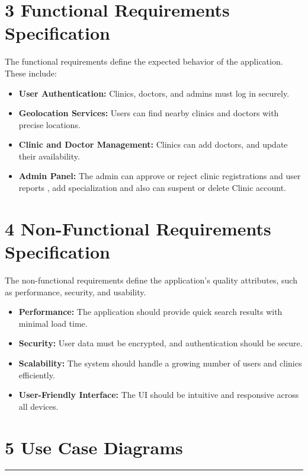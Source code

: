 \documentclass[12pt]{report}
\begin{document}
\section*{\textbf{3 Functional Requirements Specification}}

\noindent The functional requirements define the expected behavior of the application. These include:

\begin{itemize}
	\item \textbf{User Authentication:} Clinics, doctors, and admins must log in securely.
	\item \textbf{Geolocation Services:} Users can find nearby clinics and doctors with precise locations.
	\item \textbf{Clinic and Doctor Management:} Clinics can add doctors, and update their availability.
	\item \textbf{Admin Panel:} The admin can approve or reject clinic registrations and user reports , add specialization and also can suspent or delete Clinic account.
\end{itemize}

\section*{\textbf{4 Non-Functional Requirements Specification}}
\noindent The non-functional requirements define the application's quality attributes, such as performance, security, and usability.

\begin{itemize}
	\item \textbf{Performance:} The application should provide quick search results with minimal load time.
	\item \textbf{Security:} User data must be encrypted, and authentication should be secure.
	\item \textbf{Scalability:} The system should handle a growing number of users and clinics efficiently.
	\item \textbf{User-Friendly Interface:} The UI should be intuitive and responsive across all devices.
\end{itemize}

\newpage
\section*{\textbf{5 Use Case Diagrams}}
\rule{0.45\linewidth}{0.7pt}
\end{document}
